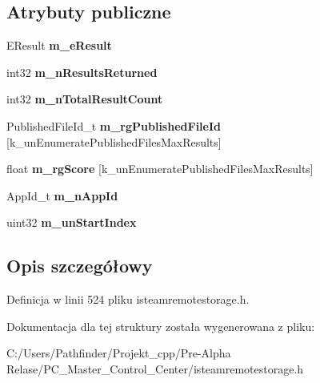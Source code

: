 \subsection*{Atrybuty publiczne}
\begin{DoxyCompactItemize}
\item 
\mbox{\label{struct_remote_storage_enumerate_workshop_files_result__t_a6a98cfa954c7ce0c6ff0c6935a0f55cb}} 
E\+Result {\bfseries m\+\_\+e\+Result}
\item 
\mbox{\label{struct_remote_storage_enumerate_workshop_files_result__t_a88c50bf47247cbf3a4af74aaad227236}} 
int32 {\bfseries m\+\_\+n\+Results\+Returned}
\item 
\mbox{\label{struct_remote_storage_enumerate_workshop_files_result__t_af5e984a3c393dc6c6d34ef38156b280b}} 
int32 {\bfseries m\+\_\+n\+Total\+Result\+Count}
\item 
\mbox{\label{struct_remote_storage_enumerate_workshop_files_result__t_a9fb6272f5046468cc90f48203a52f71a}} 
Published\+File\+Id\+\_\+t {\bfseries m\+\_\+rg\+Published\+File\+Id} \mbox{[}k\+\_\+un\+Enumerate\+Published\+Files\+Max\+Results\mbox{]}
\item 
\mbox{\label{struct_remote_storage_enumerate_workshop_files_result__t_ac22128e73f11e73c9a6fa612c43f1836}} 
float {\bfseries m\+\_\+rg\+Score} \mbox{[}k\+\_\+un\+Enumerate\+Published\+Files\+Max\+Results\mbox{]}
\item 
\mbox{\label{struct_remote_storage_enumerate_workshop_files_result__t_ac3f7586dac92d1d1a5798764cfd2c3e4}} 
App\+Id\+\_\+t {\bfseries m\+\_\+n\+App\+Id}
\item 
\mbox{\label{struct_remote_storage_enumerate_workshop_files_result__t_a0bbb74d2e98fd0adb0904b115c00ecaa}} 
uint32 {\bfseries m\+\_\+un\+Start\+Index}
\end{DoxyCompactItemize}


\subsection{Opis szczegółowy}


Definicja w linii 524 pliku isteamremotestorage.\+h.



Dokumentacja dla tej struktury została wygenerowana z pliku\+:\begin{DoxyCompactItemize}
\item 
C\+:/\+Users/\+Pathfinder/\+Projekt\+\_\+cpp/\+Pre-\/\+Alpha Relase/\+P\+C\+\_\+\+Master\+\_\+\+Control\+\_\+\+Center/isteamremotestorage.\+h\end{DoxyCompactItemize}
